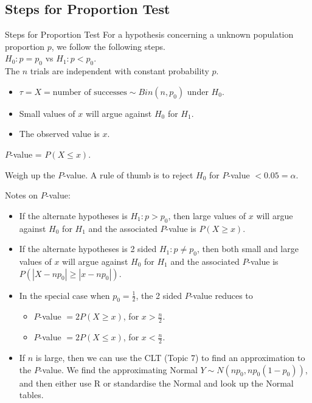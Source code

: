 \documentclass[t,xcolor=pdftex,dvipsnames,table]{beamer}
\begin{document}
\subsection[Proportion]{Steps for Proportion Test}
\begin{frame}[fragile]{Steps for Proportion Test}
For a hypothesis concerning a unknown population proportion $p$, we follow the following steps. \\

\vspace{.5cm}
 $H_{0}: p = p_{0}$ vs $H_{1}: p < p_{0}$. \\

 The $n$ trials are independent with constant probability $p$.

\begin{itemize}
\item $\tau = X =  \mbox{number of successes} \sim Bin(n,p_{0})$ under $H_{0}$. 
\item Small values of $x$ will argue against $H_{0}$ for $H_{1}$. 
\item The observed value is $x$. 
\end{itemize}

 $P$-value = $P( X \leq x)$.

 Weigh up the $P$-value. A rule of thumb is to reject $H_{0}$ for $P$-value $< 0.05 = \alpha$.
\end{frame}  

\begin{frame}{}
Notes on $P$-value:

\begin{itemize}
\item If the alternate hypotheses is $H_{1}: p > p_{0}$, then large values of $x$ will argue against $H_{0}$ for $H_{1}$ and the associated $P$-value is $P( X \geq x)$. 
\item If the alternate hypotheses is 2 sided $H_{1}: p \neq p_{0}$, then both small and large values of $x$ will argue against $H_{0}$ for $H_{1}$ and the associated $P$-value is $P( |X-n p_{0}| \geq |x-n p_{0}|)$.
\item In the special case when $p_{0} = \frac{1}{2}$, the 2 sided $P$-value reduces to
\begin{itemize}
\item $P$-value $= 2P( X \geq x)$, for $x > \frac{n}{2}$.
\item $P$-value $= 2P( X \leq x)$, for $x < \frac{n}{2}$.
\end{itemize}
\item If $n$ is large, then we can use the CLT (Topic 7) to find an approximation to the $P$-value. We find the approximating Normal $Y \sim N(n p_{0}, n p_{0} (1-p_{0}))$, and then either use R or standardise the Normal and look up the Normal tables.
\end{itemize}
\end{frame}
\end{document}
